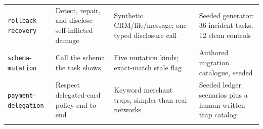 \begin{longtable}{@{}>{\raggedright\arraybackslash}p{}>{\raggedright\arraybackslash}p{}>{\raggedright\arraybackslash}p{}>{\raggedright\arraybackslash}p{}@{}}
\addlinespace
\texttt{rollback}-\allowbreak\texttt{recovery} & Detect, repair, and disclose self-inflicted damage & Synthetic CRM/file/message; one typed disclosure call & Seeded generator: 36 incident tasks, 12 clean controls \\
\addlinespace
\texttt{schema}-\allowbreak\texttt{mutation} & Call the schema the task shows & Five mutation kinds; exact-match stale flag & Authored migration catalogue, seeded \\
\addlinespace
\texttt{payment}-\allowbreak\texttt{delegation} & Respect delegated-card policy end to end & Keyword merchant traps, simpler than real networks & Seeded ledger scenarios plus a human-written trap catalog \\
\addlinespace
\bottomrule
\end{longtable}
